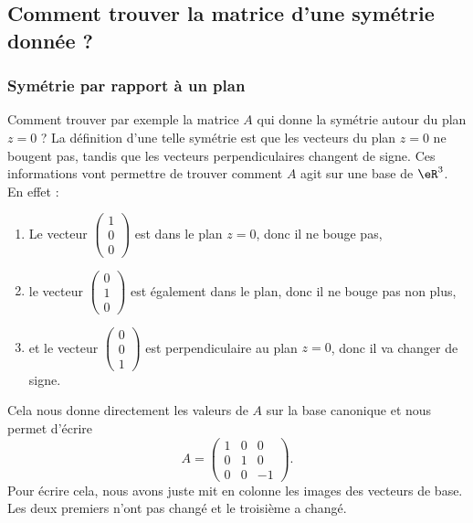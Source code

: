 \subsection{Comment trouver la matrice d'une symétrie donnée ?}
\label{SubSecMtrSym}

\subsubsection{Symétrie par rapport à un plan}

Comment trouver par exemple la matrice $A$ qui donne la symétrie autour du plan $z=0$ ? La définition d'une telle symétrie est que les vecteurs du plan $z=0$ ne bougent pas, tandis que les vecteurs perpendiculaires changent de signe. Ces informations vont permettre de trouver comment $A$ agit sur une base de $\eR^3$. En effet :
\begin{enumerate}

	\item
		Le vecteur $\begin{pmatrix}
			1	\\ 
			0	\\ 
			0	
		\end{pmatrix}$ est dans le plan $z=0$, donc il ne bouge pas,

	\item
		le vecteur $\begin{pmatrix}
			0	\\ 
			1	\\ 
			0	
		\end{pmatrix}$ est également dans le plan, donc il ne bouge pas non plus,

	\item
		et le vecteur $\begin{pmatrix}
			0	\\ 
			0	\\ 
			1	
		\end{pmatrix}$ est perpendiculaire au plan $z=0$, donc il va changer de signe.

\end{enumerate}
Cela nous donne directement les valeurs de $A$ sur la base canonique et nous permet d'écrire 
\begin{equation}
	A=\begin{pmatrix}
		1	&	0	&	0	\\
		0	&	1	&	0	\\
		0	&	0	&	-1
	\end{pmatrix}.
\end{equation}
Pour écrire cela, nous avons juste mit en colonne les images des vecteurs de base. Les deux premiers n'ont pas changé et le troisième a changé.

